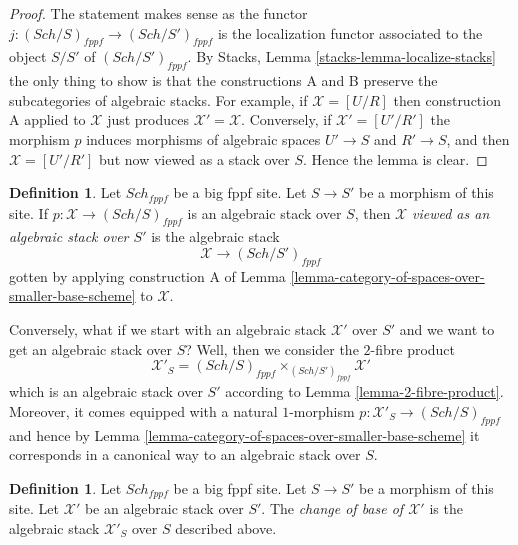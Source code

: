 \documentclass{stacks-project}
\theoremstyle{plain}
\theoremstyle{definition}
\newtheorem{definition}[subsection]{Definition}
\theoremstyle{remark}
\numberwithin{equation}{subsection}
\def\Sch{\mathit{Sch}}
\begin{document}
\begin{proof}
The statement makes sense as the functor
$j : (\Sch/S)_{fppf} \to (\Sch/S')_{fppf}$
is the localization functor associated to the object $S/S'$
of $(\Sch/S')_{fppf}$. By
Stacks, Lemma \ref{stacks-lemma-localize-stacks}
the only thing to show is that the constructions A and B
preserve the subcategories of algebraic stacks.
For example, if $\mathcal{X} = [U/R]$ then construction A
applied to $\mathcal{X}$ just produces
$\mathcal{X}' = \mathcal{X}$. Conversely, if $\mathcal{X}' = [U'/R']$
the morphism $p$ induces morphisms of algebraic spaces
$U' \to S$ and $R' \to S$, and then $\mathcal{X} = [U'/R']$
but now viewed as a stack over $S$. Hence the lemma is clear.
\end{proof}

\begin{definition}
\label{definition-viewed-as}
Let $\Sch_{fppf}$ be a big fppf site.
Let $S \to S'$ be a morphism of this site.
If $p : \mathcal{X} \to (\Sch/S)_{fppf}$
is an algebraic stack over $S$, then
$\mathcal{X}$ {\it viewed as an algebraic stack over $S'$}
is the algebraic stack
$$
\mathcal{X} \longrightarrow (\Sch/S')_{fppf}
$$
gotten by applying construction A of
Lemma \ref{lemma-category-of-spaces-over-smaller-base-scheme}
to $\mathcal{X}$.
\end{definition}

\noindent
Conversely, what if we start with an algebraic stack $\mathcal{X}'$
over $S'$ and we want to get an algebraic stack over $S$?
Well, then we consider the $2$-fibre product
$$
\mathcal{X}'_S
=
(\Sch/S)_{fppf} \times_{(\Sch/S')_{fppf}} \mathcal{X}'
$$
which is an algebraic stack over $S'$ according to
Lemma \ref{lemma-2-fibre-product}.
Moreover, it comes equipped with a natural $1$-morphism
$p : \mathcal{X}'_S \to (\Sch/S)_{fppf}$ and hence by
Lemma \ref{lemma-category-of-spaces-over-smaller-base-scheme}
it corresponds in a canonical way to an algebraic stack over $S$.

\begin{definition}
\label{definition-change-of-base}
Let $\Sch_{fppf}$ be a big fppf site.
Let $S \to S'$ be a morphism of this site.
Let $\mathcal{X}'$ be an algebraic stack over $S'$.
The {\it change of base of $\mathcal{X}'$} is the
algebraic stack $\mathcal{X}'_S$ over $S$ described above.
\end{definition}








\end{document}
